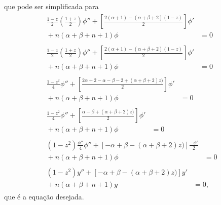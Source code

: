 \documentclass[a4paper,12pt, leqno, answers]{exam}
\begin{document}
\begin{questions}
\begin{solution}
\begin{align*}
\begin{split}
            \end{split}
        \end{align*}
        que pode ser simplificada para
        \begin{align*}
            \begin{split}
                \frac{1 - z}{2} \left( \frac{1 + z}{2} \right) \phi'' + \left[ \frac{2(\alpha + 1) - (\alpha + \beta + 2) (1 - z)}{2} \right] \phi' \\ {}+ n (\alpha + \beta + n + 1) \phi &= 0
            \end{split} \\
            \begin{split}
                \frac{1 - z}{2} \left( \frac{1 + z}{2} \right) \phi'' + \left[ \frac{2(\alpha + 1) - (\alpha + \beta + 2) (1 - z)}{2} \right] \phi' \\ {}+ n (\alpha + \beta + n + 1) \phi &= 0
            \end{split} \\
            \begin{split}
                \frac{1 - z^2}{4} \phi'' + \left[ \frac{2\alpha + 2 - \alpha - \beta - 2 + (\alpha + \beta + 2)z)}{2} \right] \phi' \\ {}+ n (\alpha + \beta + n + 1) \phi &= 0
            \end{split} \\
            \begin{split}
                \frac{1 - z^2}{4} \phi'' + \left[ \frac{\alpha - \beta + (\alpha + \beta + 2)z)}{2} \right] \phi' \\ {}+ n (\alpha + \beta + n + 1) \phi &= 0
            \end{split} \\
            \begin{split}
                (1 - z^2) \frac{\phi''}{4} \phi'' + \left[ - \alpha + \beta - (\alpha + \beta + 2)z)\right] \frac{-\phi'}{2} \\ {}+ n (\alpha + \beta + n + 1) \phi &= 0
            \end{split} \\
            \begin{split}
                (1 - z^2) y'' + \left[ - \alpha + \beta - (\alpha + \beta + 2)z)\right] y' \\ {}+ n (\alpha + \beta + n + 1) y &= 0,
            \end{split}
        \end{align*}
        que \'{e} a equa\c{c}\~{a}o desejada.
    \end{solution}


\end{questions}
\end{document}
